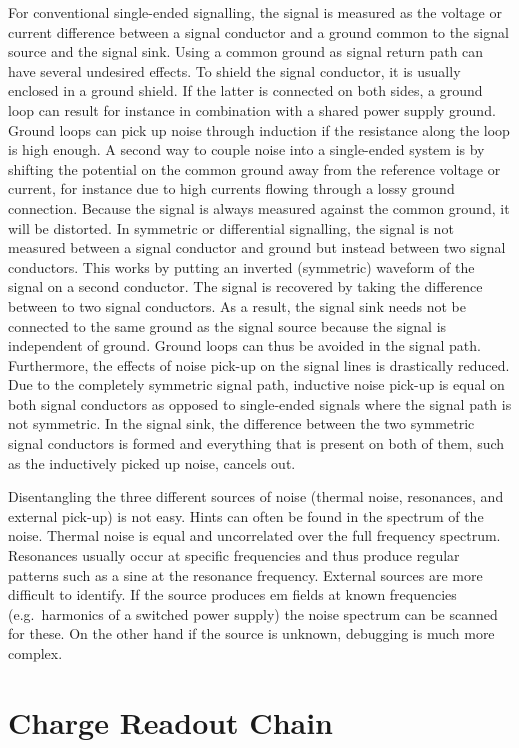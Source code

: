 For conventional single-ended signalling, the signal is measured as the voltage or current difference between a signal conductor and a ground common to the signal source and the signal sink.
Using a common ground as signal return path can have several undesired effects.
To shield the signal conductor, it is usually enclosed in a ground shield.
If the latter is connected on both sides, a ground loop can result for instance in combination with a shared power supply ground.
Ground loops can pick up noise through induction if the resistance along the loop is high enough.
A second way to couple noise into a single-ended system is by shifting the potential on the common ground away from the reference voltage or current, for instance due to high currents flowing through a lossy ground connection.
Because the signal is always measured against the common ground, it will be distorted.
In symmetric or differential signalling, the signal is not measured between a signal conductor and ground but instead between two signal conductors.
This works by putting an inverted (symmetric) waveform of the signal on a second conductor.
The signal is recovered by taking the difference between to two signal conductors.
As a result, the signal sink needs not be connected to the same ground as the signal source because the signal is independent of ground.
Ground loops can thus be avoided in the signal path.
Furthermore, the effects of noise pick-up on the signal lines is drastically reduced.
Due to the completely symmetric signal path, inductive noise pick-up is equal on both signal conductors as opposed to single-ended signals where the signal path is not symmetric.
In the signal sink, the difference between the two symmetric signal conductors is formed and everything that is present on both of them, such as the inductively picked up noise, cancels out.

Disentangling the three different sources of noise (thermal noise, resonances, and external pick-up) is not easy.
Hints can often be found in the spectrum of the noise.
Thermal noise is equal and uncorrelated over the full frequency spectrum.
Resonances usually occur at specific frequencies and thus produce regular patterns such as a sine at the resonance frequency.
External sources are more difficult to identify.
If the source produces \gls{em} fields at known frequencies (e.g.\ harmonics of a switched power supply) the noise spectrum can be scanned for these.
On the other hand if the source is unknown, debugging is much more complex.


\section{\AT{} Charge Readout Chain}
\label{sec:studies_at-ro}

